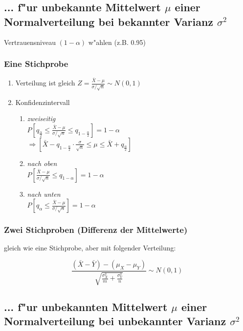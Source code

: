 \documentclass[10pt, a4paper, twocolumn]{scrartcl}
\begin{document}
\subsection{... f"ur unbekannte Mittelwert $\mu$ einer Normalverteilung bei bekannter Varianz $\sigma^2$}

Vertrauensniveau $(1-\alpha)$ w"ahlen (z.B. 0.95)

\subsubsection{Eine Stichprobe}

\begin{enumerate}
 \item Verteilung ist gleich $Z=\frac{\bar{X}-\mu}{\sigma/\sqrt{n}}\sim N(0,1)$
 \item Konfidenzintervall
  \begin{enumerate}
   \item \textit{zweiseitig}\\
    $P[q_{\frac{\alpha}{2}}\leq\frac{\bar{X}-\mu}{\sigma/\sqrt{n}}\leq q_{1-\frac{\alpha}{2}}]=1-\alpha$\\
    $\Rightarrow [\bar{X}- q_{1-\frac{\alpha}{2}}\cdotp\frac{\sigma}{\sqrt{n}}\leq\mu\leq\bar{X}+q_{\frac{\alpha}{2}}]$
   \item \textit{nach oben}\\
    $P[\frac{\bar{X}-\mu}{\sigma/\sqrt{n}}\leq q_{1-\alpha}]=1-\alpha$
   \item \textit{nach unten}\\
    $P[q_{\alpha}\leq\frac{\bar{X}-\mu}{\sigma/\sqrt{n}}]=1-\alpha$
  \end{enumerate}
\end{enumerate}


\subsubsection{Zwei Stichproben (Differenz der Mittelwerte)}

gleich wie eine Stichprobe, aber mit folgender Verteilung:

$$\frac{(\bar{X}-\bar{Y})-(\mu_X-\mu_Y)}{\sqrt{\frac{\sigma_X^2}{m}+\frac{\sigma_Y^2}{n}}}\sim N(0,1)$$

\subsection{... f"ur unbekannten Mittelwert $\mu$ einer Normalverteilung bei unbekannter Varianz $\sigma^2$}
\end{document}
